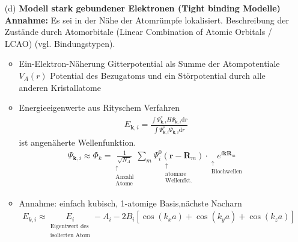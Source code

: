 \begin{itemize}
\begin{itemize}
        \end{itemize}
    \item[(d)] \textbf{Modell stark gebundener Elektronen (Tight binding Modelle)} \\
    \textbf{Annahme:} Es sei in der Nähe der Atomrümpfe lokalisiert. Beschreibung der Zustände durch Atomorbitale (Linear Combination of Atomic Orbitals / LCAO) (vgl. Bindungstypen).\\
    \begin{itemize}
        \item Ein-Elektron-Näherung Gitterpotential als Summe der Atompotentiale $V_A(r)$ Potential des Bezugatoms und ein Störpotential durch alle anderen Kristallatome
        \item Energieeigenwerte aus Rityschem Verfahren \begin{align*}
            E_{\textbf{k},i} = \frac{\int \Psi_{\textbf{k},i}^* H \Psi_{\textbf{k},i} \mathrm{d}r}{\int \Psi_{\textbf{k},i}^* \Psi_{\textbf{k},i} \mathrm{d}r}
        \end{align*}
        ist angenäherte Wellenfunktion.
        \begin{align*}
            \Psi_{\textbf{k},i}\approx \Phi_k = \underset{\begin{matrix}
                \uparrow\\
                \text{Anzahl}\\
                \text{Atome}
            \end{matrix}}{\frac{1}{\sqrt{N_A}}}\sum_m \underset{\begin{matrix}
                \uparrow\\
                \text{atomare}\\
                \text{Wellenfkt.}
            \end{matrix}}{\Psi^0_i(\textbf{r}-\textbf{R}_m)}\cdot \underset{\begin{matrix}
                \uparrow\\
                \text{Blochwellen}
            \end{matrix}}{e^{i \textbf{k} \textbf{R}_m}}
        \end{align*}
        \item Annahme: einfach kubisch, 1-atomige Basis,nächste Nacharn 
        \begin{align*}
            E_{k,i} \approx  \underset{\begin{matrix}
                \text{Eigentwert des}\\
                \text{isolierten Atom}           \end{matrix}}{E_i} - A_i - 2B_i[\cos(k_x a)+ \cos(k_y a) + \cos(k_z a)]

\end{align*}
\end{itemize}
\end{itemize}
